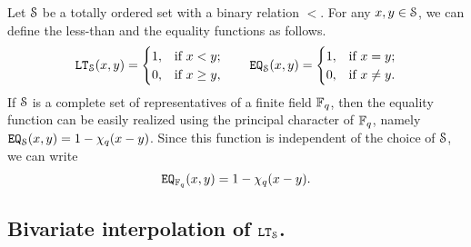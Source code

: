 Let $\S$ be a totally ordered set with a binary relation $<$.
For any $x,y \in \S$, we can define the less-than and the equality functions as follows.
\begin{align*}
  \LT_\S(x,y) = 
  \begin{cases}
    1, & \text{if } x < y; \\
    0, & \text{if } x \ge y, \\
  \end{cases}
  \qquad
  \EQ_\S(x,y) = 
  \begin{cases}
    1, & \text{if } x = y; \\
    0, & \text{if } x \neq y. \\
  \end{cases}
\end{align*}
If $\S$ is a complete set of representatives of a finite field $\F_\fieldcard$, then the equality function can be easily realized using the principal character of $\F_\fieldcard$, namely $\EQ_\S(x,y) = 1 - \princhar_\fieldcard(x-y)$.
Since this function is independent of the choice of $\S$, we can write
\begin{align*}
  \EQ_{\F_{\fieldcard}}(x,y) = 1 - \princhar_\fieldcard(x-y).
\end{align*}

\subsection{Bivariate interpolation of $\LT_\S$.}

